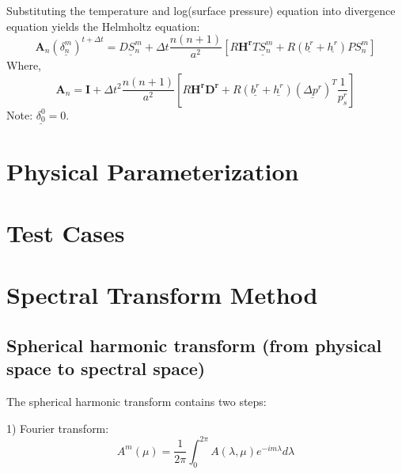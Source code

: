 \documentclass[12pt,a4paper]{book}
\begin{document}
Substituting the temperature and log(surface pressure) equation into divergence equation yields the Helmholtz equation:
	\begin{equation}
	\boldsymbol{A}_n (\underline{\delta_n^m})^{t+\Delta t} = \underline{DS_n^m} + \Delta t \frac{n(n+1)}{a^2} 
	\left[ R\boldsymbol{H^r} \underline{TS_n^m} + R(\underline{b^r} + \underline{h^r}) PS_n^m \right] 
	\end{equation}	
Where, 
	\begin{equation}
	\boldsymbol{A}_n = \boldsymbol{I} + \Delta t^2 \frac{n(n+1)}{a^2} 
	\left[ R\boldsymbol{H^r} \boldsymbol{D^r} + R(\underline{b^r} + \underline{h^r}) (\underline{\Delta p^r})^T \frac{1}{p_s^r} \right] 
	\end{equation}	
Note: $\underline{\delta_0^0} = 0$.


\chapter{Physical Parameterization} \label{3.physics}


\chapter{Test Cases} \label{4.testcases}


\appendix
\renewcommand{\theequation}{\Alph{chapter}.\arabic{equation}}

\chapter{Spectral Transform Method}  \label{appendixA.spectraltransform}

\section{Spherical harmonic transform (from physical space to spectral space)}

The spherical harmonic transform contains two steps:

1) Fourier transform:
	\begin{equation}  \label{eq:fft}
	A^m(\mu) = \frac{1}{2\pi} \int_0^{2\pi} A(\lambda, \mu ) e^{-im\lambda} d\lambda 
	\end{equation}
\end{document}
